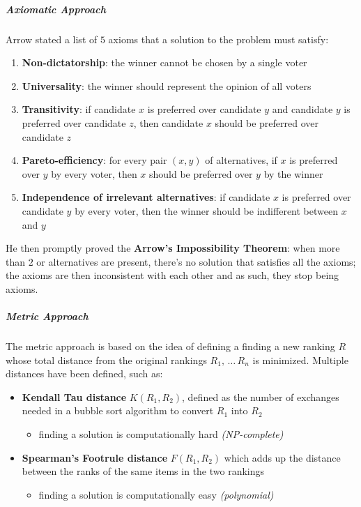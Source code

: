 \documentclass[english]{article}
\begin{document}
\subparagraph*{Axiomatic Approach}
Arrow stated a list of \(5\) axioms that a solution to the problem must satisfy:

\begin{enumerate}[label=axiom \arabic*., leftmargin=*, labelindent=1em, widest*=8]
  \item \textbf{Non-dictatorship}: the winner cannot be chosen by a single voter
  \item \textbf{Universality}: the winner should represent the opinion of all voters
  \item \textbf{Transitivity}: if candidate \(x\) is preferred over candidate \(y\) and candidate \(y\) is preferred over candidate \(z\), then candidate \(x\) should be preferred over candidate \(z\)
  \item \textbf{Pareto-efficiency}: for every pair \(\left( x, y \right)\) of alternatives, if \(x\) is preferred over \(y\) by every voter, then \(x\) should be preferred over \(y\) by the winner
  \item \textbf{Independence of irrelevant alternatives}: if candidate \(x\) is preferred over candidate \(y\) by every voter, then the winner should be indifferent between \(x\) and \(y\)
\end{enumerate}

He then promptly proved the \textbf{Arrow's Impossibility Theorem}: when more than \(2\) or alternatives are present, there's no solution that satisfies all the axioms;
the axioms are then inconsistent with each other and as such, they stop being axioms.

\subparagraph*{Metric Approach}
The metric approach is based on the idea of defining a finding a new ranking \(R\) whose total distance from the original rankings \(R_1, \, \ldots \, R_n\) is minimized.
Multiple distances have been defined, such as:
\begin{itemize}
  \item \textbf{Kendall Tau distance} \(K\left( R_1, R_2 \right)\), defined as the number of exchanges needed in a bubble sort algorithm to convert \(R_1\) into \(R_2\)
        \begin{itemize}[label=\xmarkthin]
          \item finding a solution is computationally hard \textit{(NP-complete)}
        \end{itemize}
  \item \textbf{Spearman's Footrule distance} \(F\left( R_1, R_2 \right)\) which adds up the distance between the ranks of the same items in the two rankings
        \begin{itemize}[label=\cmarkthin]
          \item finding a solution is computationally easy \textit{(polynomial)}
        \end{itemize}
\end{itemize}
\end{document}
